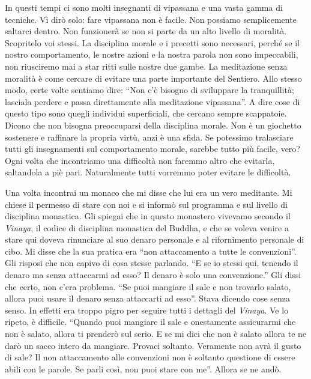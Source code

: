 In questi tempi ci sono molti insegnanti di vipassana e una vasta gamma
di tecniche. Vi dirò solo: fare vipassana non è facile. Non possiamo
semplicemente saltarci dentro. Non funzionerà se non si parte da un alto
livello di moralità. Scopritelo voi stessi. La disciplina morale e i
precetti sono necessari, perché se il nostro comportamento, le nostre
azioni e la nostra parola non sono impeccabili, non riusciremo mai a
star ritti sulle nostre due gambe. La meditazione senza moralità è come
cercare di evitare una parte importante del Sentiero. Allo stesso modo,
certe volte sentiamo dire: ``Non c'è bisogno di sviluppare la
tranquillità; lasciala perdere e passa direttamente alla meditazione
vipassana''. A dire cose di questo tipo sono quegli individui
superficiali, che cercano sempre scappatoie. Dicono che non bisogna
preoccuparsi della disciplina morale. Non è un giochetto sostenere e
raffinare la propria virtù, anzi è una sfida. Se potessimo tralasciare
tutti gli insegnamenti sul comportamento morale, sarebbe tutto più
facile, vero? Ogni volta che incontriamo una difficoltà non faremmo
altro che evitarla, saltandola a piè pari. Naturalmente tutti vorremmo
poter evitare le difficoltà.

Una volta incontrai un monaco che mi disse che lui era un vero
meditante. Mi chiese il permesso di stare con noi e si informò sul
programma e sul livello di disciplina monastica. Gli spiegai che in
questo monastero vivevamo secondo il \emph{Vinaya}, il codice di
disciplina monastica del Buddha, e che se voleva venire a stare qui
doveva rinunciare al suo denaro personale e al rifornimento personale di
cibo. Mi disse che la sua pratica era ``non attaccamento a tutte le
convenzioni''. Gli risposi che non capivo di cosa stesse parlando. ``E
se io stessi qui, tenendo il denaro ma senza attaccarmi ad esso? Il
denaro è solo una convenzione.'' Gli dissi che certo, non c'era
problema. ``Se puoi mangiare il sale e non trovarlo salato, allora puoi
usare il denaro senza attaccarti ad esso''. Stava dicendo cose senza
senso. In effetti era troppo pigro per seguire tutti i dettagli
del \emph{Vinaya}. Ve lo ripeto, è difficile. ``Quando puoi mangiare il
sale e onestamente assicurarmi che non è salato, allora ti prenderò sul
serio. E se mi dici che non è salato allora te ne darò un sacco intero
da mangiare. Provaci soltanto. Veramente non avrà il gusto di sale? Il
non attaccamento alle convenzioni non è soltanto questione di essere
abili con le parole. Se parli così, non puoi stare con me''. Allora se
ne andò.

